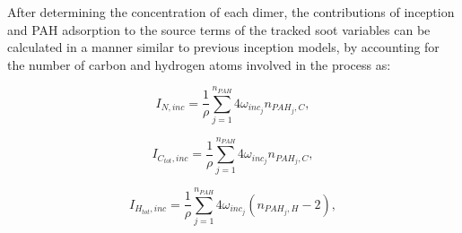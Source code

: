 
After determining the concentration of each dimer, the contributions of inception and PAH adsorption to the source terms of the tracked soot variables can be calculated in a manner similar to previous inception models, by accounting for the number of carbon and hydrogen atoms involved in the process as:

\begin{equation}
	I_{N,{inc}} = \frac{1}{\rho}
	\sum_{j=1}^{n_{PAH}}
	4\omega_{inc_{j}} 
	n_{PAH_j,C}
	\label{eqn:IN_inc_dimcoal},
\end{equation}

\begin{equation}
	I_{C_{tot},{inc}} = \frac{1}{\rho}
	\sum_{j=1}^{n_{PAH}}
	4\omega_{inc_{j}} 
	n_{PAH_j,C}
	\label{eqn:ICtot_inc_dimcoal},
\end{equation}

\begin{equation}
	I_{H_{tot},{inc}} = \frac{1}{\rho}
	\sum_{j=1}^{n_{PAH}}
	4\omega_{inc_{j}} 
	\left(
	n_{PAH_j,H}-2
	\right)
	\label{eqn:IHtot_inc_dimcoal},
\end{equation}

